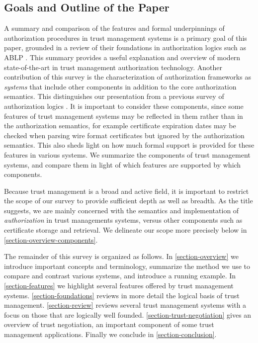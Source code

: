 \subsection{Goals and Outline of the Paper}

A summary and comparison of the features and formal underpinnings of
authorization procedures in trust management systems is a primary goal
of this paper, grounded in a review of their foundations in
authorization logics such as ABLP \cite{Abadi:CACDS}.  This summary
provides a useful explanation and overview of modern state-of-the-art
in trust management authorization technology.  Another contribution of
this survey is the characterization of authorization frameworks as
\emph{systems} that include other components in addition to the core
authorization semantics. This distinguishes our presentation from a
previous survey of authorization logics \cite{Abadi:LAC}. It is
important to consider these components, since some features of trust
management systems may be reflected in them rather than in the
authorization semantics, for example certificate expiration dates may
be checked when parsing wire format certificates but ignored by the
authorization semantics. This also sheds light on how much formal
support is provided for these features in various systems. We
summarize the components of trust management systems, and compare them
in light of which features are supported by which components. 

Because trust management is a broad and active field, it is important
to restrict the scope of our survey to provide sufficient depth as
well as breadth.  As the title suggests, we are mainly concerned with
the semantics and implementation of \emph{authorization} in trust
managements systems, versus other components such as certificate
storage and retrieval.  We delineate our scope more precisely
below in \autoref{section-overview-components}.

The remainder of this survey is organized as follows. In
\autoref{section-overview} we introduce important concepts and terminology,
summarize the method we use to compare and contrast various systems, and
introduce a running example. In \autoref{section-features} we highlight
several features offered by trust management systems.
\autoref{section-foundations} reviews in more detail the logical basis of
trust management. \autoref{section-review} reviews several trust management
systems with a focus on those that are logically well founded.
\autoref{section-trust-negotiation} gives an overview of trust negotiation,
an important component of some trust management applications. Finally we
conclude in \autoref{section-conclusion}.
